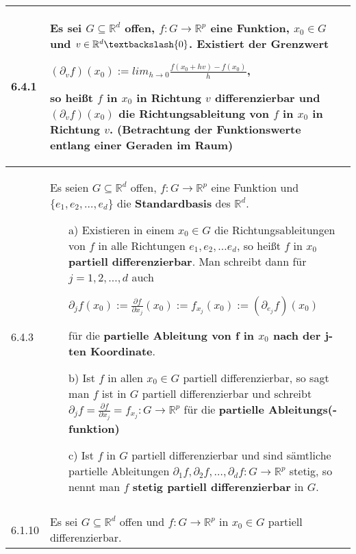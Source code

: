     \begin{longtable}{p{1cm} p{16cm}}
        \toprule

        6.4.1 & Es sei $G \subseteq \mathbb{R}^d$ offen, $f: G \rightarrow \mathbb{R}^p$ eine Funktion, $x_0 \in G$ und $v \in \mathbb{R}^d 
                \textbackslash \{0\}$. Existiert der Grenzwert \hfill \break
                \centerline{$ (\partial_v f) (x_0) := lim_{h \rightarrow 0} \frac{f(x_0 +hv) - f(x_0)}{h}$,}
                so heißt $f$ in $x_0$ in Richtung $v$ differenzierbar und $(\partial_v f)(x_0)$ die \textbf{Richtungsableitung}
                von $f$ in $x_0$ in Richtung $v$. (Betrachtung der Funktionswerte entlang einer Geraden im Raum) \\
        \midrule
        6.4.3 & Es seien $G \subseteq \mathbb{R}^d$ offen, $f: G \rightarrow \mathbb{R}^p$ eine Funktion und $\{ e_1,e_2,\dots,e_d \}$ die
                \textbf{Standardbasis} des $\mathbb{R}^d$.
                \begin{itemize}[topsep=-0.5cm]
                    \item[a)] Existieren in einem $x_0 \in G$ die Richtungsableitungen von $f$ in alle Richtungen $e_1, e_2, \dots e_d$, so heißt
                                $f$ in $x_0$ \textbf{partiell differenzierbar}. Man schreibt dann für $j =1,2,\dots,d$ auch \hfill \break
                                \centerline{$ \partial_j f(x_0) := \frac{\partial f}{\partial x_j} (x_0) := f_{x_j}(x_0) := (\partial_{e_j}f) (x_0)$}
                                für die \textbf{partielle Ableitung von f in $x_0$ nach der j-ten Koordinate}.
                    \item[b)] Ist $f$ in allen $x_0 \in G$ partiell differenzierbar, so sagt man $f$ ist in $G$ partiell differenzierbar und schreibt
                                $\partial_j f = \frac{\partial f}{\partial x_j} = f_{x_j} : G \rightarrow \mathbb{R}^p$ für die \textbf{partielle
                                Ableitungs(-funktion)}
                    \item[c)] Ist $f$ in $G$ partiell differenzierbar und sind sämtliche partielle Ableitungen $\partial_1 f, \partial_2 f, \dots,
                                \partial_d f: G \rightarrow \mathbb{R}^p$ stetig, so nennt man $f$ \textbf{stetig partiell differenzierbar} in $G$.
                \end{itemize} \vspace{-0cm} \\  \\
        \midrule
        6.1.10& Es sei $G \subseteq \mathbb{R}^d$ offen und $f: G \rightarrow \mathbb{R}^p$ in $x_0 \in G$ partiell differenzierbar. 

\end{longtable}
